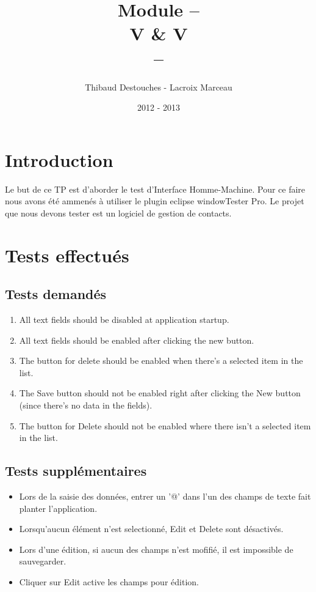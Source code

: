 \documentclass{article}
\title{Module --
\\
V \& V
\\
--}
\author{Thibaud Destouches - Lacroix Marceau}
\date{2012 - 2013}
\begin{document}
\begin{titlepage}
\maketitle
\tableofcontents
\end{titlepage}

\newpage
\section{Introduction}

Le but de ce TP est d’aborder le test d’Interface Homme-Machine. Pour ce faire nous avons été ammenés à utiliser le plugin eclipse windowTester Pro. Le projet que nous devons tester est un logiciel de gestion de contacts.

\section{Tests effectués}

\subsection{Tests demandés}
\begin{enumerate}
\item All text fields should be disabled at application startup.
\item All text fields should be enabled after clicking the new button.
\item The button for delete should be enabled when there's a selected item in the list.
\item The Save button should not be enabled right after clicking the New button (since there's no data in the fields). 
\item The button for Delete should not be enabled where there isn't a selected item in the list.
\end{enumerate}
\subsection{Tests supplémentaires}
\begin{itemize}
\item Lors de la saisie des données, entrer un '@' dans l'un des champs de texte fait planter l'application.	
\item Lorsqu'aucun élément n'est selectionné, Edit et Delete sont désactivés.
\item Lors d'une édition, si aucun des champs n'est mofifié, il est impossible de sauvegarder.
\item Cliquer sur Edit active les champs pour édition.
\end{itemize}
\end{document}

